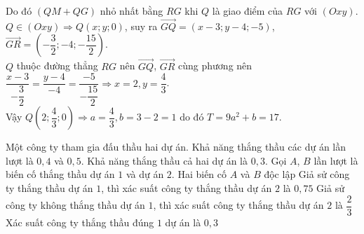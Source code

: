 \begin{ex}
{\begin{itemchoice}
		Do đó $(QM+QG)$ nhỏ nhất bằng $RG$ khi $Q$ là giao điểm của $RG$ với $(Oxy)$.\\
		$Q\in (Oxy)\Rightarrow Q(x;y;0)$, suy ra $\overrightarrow{GQ}=(x-3;y-4;-5)$, $\overrightarrow{GR}=\left(-\dfrac{3}{2};-4;-\dfrac{15}{2}\right)$.\\
		$Q$ thuộc đường thẳng $RG$ nên $\overrightarrow{GQ}$, $\overrightarrow{GR}$ cùng phương nên $\dfrac{x-3}{-\dfrac{3}{2}}=\dfrac{y-4}{-4}=\dfrac{-5}{-\dfrac{15}{2}}\Rightarrow x=2,y=\dfrac{4}{3}$.\\
		Vậy $Q\left(2;\dfrac{4}{3};0\right)\Rightarrow a=\dfrac{4}{3},b=3-2=1$ do đó $T=9a^2+b=17$.
	\end{itemchoice}}
\end{ex}

\begin{ex}%
	Một công ty tham gia đấu thầu hai dự án. Khả năng thắng thầu các dự án lần lượt là $0{,}4$ và $0{,}5$. Khả năng thắng thầu cả hai dự án là $0{,}3$. Gọi $A$, $B$ lần lượt là biến cố thắng thầu dự án $1$ và dự án $2$.
	\choiceTF
	{Hai biến cố $A$ và $B$ độc lập}
	{\True Giả sử công ty thắng thầu dự án $1$, thì xác suất công ty thắng thầu dự án $2$ là $0{,}75$}
	{Giả sử công ty không thắng thầu dự án $1$, thì xác suất công ty thắng thầu dự án $2$ là $\dfrac{2}{3}$}
	{\True Xác suất công ty thắng thầu đúng $1$ dự án là $0{,}3$}
\end{ex}

